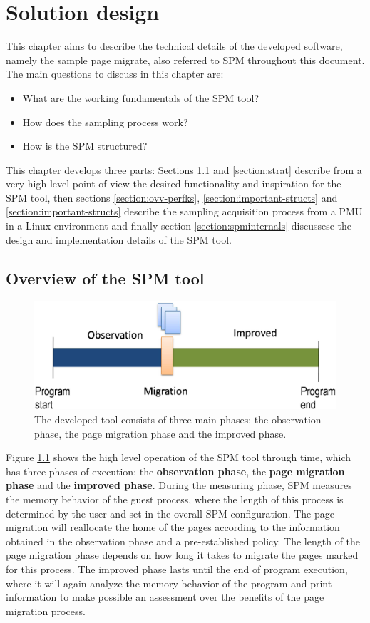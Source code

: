 \chapter{Solution design}\label{chapter:soldesign}
This chapter aims to describe the technical details of the developed software, namely the sample page migrate, also referred to SPM throughout this document. The main questions to discuss in this chapter are:
\begin{itemize}
	\item What are the working fundamentals of the SPM tool?
	\item How does the sampling process work?
	\item How is the SPM structured?
\end{itemize}

This chapter develops three parts: Sections \ref{section:ovv-spm} and \ref{section:strat} describe from a very high level point of view the desired functionality and inspiration for the SPM tool, then sections \ref{section:ovv-perfks}, \ref{section:important-structs} and \ref{section:important-structs} describe the sampling acquisition process from a PMU in a Linux environment and finally section \ref{section:spminternals} discussese the design and implementation details of the SPM tool.


\section{Overview of the SPM tool}\label{section:ovv-spm}


\begin{figure}[ht]
	\centering
		\includegraphics[width=.6\textwidth]{figures/spm-principle.eps}
		\caption[Three phases of execution of the SPM development]{The developed tool consists of three main phases: the observation phase, the page migration phase and the improved phase.}
		\label{fig:sprinciple}
\end{figure}

Figure \ref{fig:sprinciple} shows the high level operation of the SPM tool through time, which has three phases of execution: the \textbf{observation phase}, the \textbf{page migration phase} and the \textbf{improved phase}. During the measuring phase, SPM measures the memory behavior of the guest process, where the length of this process is determined by the user and set in the overall SPM configuration. The page migration will reallocate the home of the pages according to the information obtained in the observation phase and a pre-established policy. The length of the page migration phase depends on how long it takes to migrate the pages marked for this process. The improved phase lasts until the end of program execution, where it will again analyze the memory behavior of the program and print information to make possible an assessment over the benefits of the page migration process.

